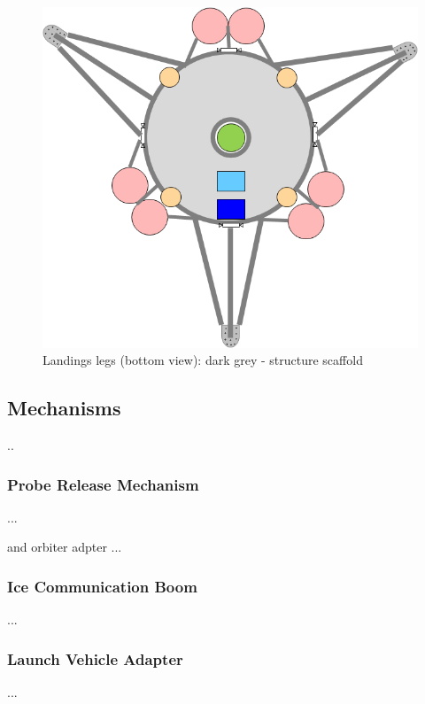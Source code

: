 \begin{figure}[htb]
	\centering
	\includegraphics[width=\textwidth]{Lander/aaronlandinglegs}
	\caption{Landings legs (bottom view): dark grey - structure scaffold \label{fig:alanderlegs}}
\end{figure}

\subsection{Mechanisms}
..


\subsubsection{Probe Release Mechanism}
...

and orbiter adpter
...

\subsubsection{Ice Communication Boom}
...

\subsubsection{Launch Vehicle Adapter}
...

